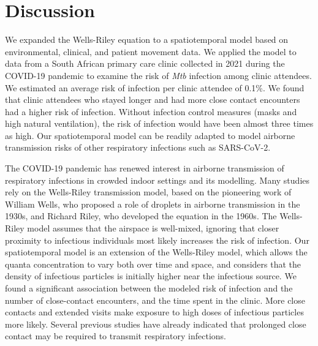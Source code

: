 \documentclass[fleqn,11pt]{wlscirep}
\begin{document}
\FloatBarrier

\newpage

\section*{Discussion}

We expanded the Wells-Riley equation to a spatiotemporal model based on environmental, clinical, and patient movement data. We applied the model to data from a South African primary care clinic collected in 2021 during the COVID-19 pandemic to examine the risk of \emph{Mtb} infection among clinic attendees. We estimated an average risk of infection per clinic attendee of 0.1\%. We found that clinic attendees who stayed longer and had more close contact encounters had a higher risk of infection. Without infection control measures (masks and high natural ventilation), the risk of infection would have been almost three times as high. Our spatiotemporal model can be readily adapted to model airborne transmission risks of other respiratory infections such as SARS-CoV-2.

The COVID-19 pandemic has renewed interest in airborne transmission of respiratory infections in crowded indoor settings\cite{Wang2021Science,Morawska2021,Greenhalgh2022BMJ} and its modelling\cite{Shen2021STBE,Buonanno2020EI,Edwards2024RiskAnalysis}. Many studies\cite{Andrews2014JID,Taylor2016IJTLD,Hella2017JInfect,Zemouri2020JDR} rely on the Wells-Riley transmission model\cite{Riley1961Book}, based on the pioneering work of William Wells, who proposed a role of droplets in airborne transmission in the 1930s\cite{Wells1934AJE}, and Richard Riley, who developed the equation in the 1960s\cite{Riley1961Book}.  The Wells-Riley model assumes that the airspace is well-mixed, ignoring that closer proximity to infectious individuals most likely increases the risk of infection. Our spatiotemporal model is an extension of the Wells-Riley model, which allows the quanta concentration to vary both over time and space, and considers that the density of infectious particles is initially higher near the infectious source\cite{Wang2021Science,Vuorinen2020SafSci,Chen2020BuildEnv}. We found a significant association between the modeled risk of infection and the number of close-contact encounters, and the time spent in the clinic. More close contacts and extended visits make exposure to high doses of infectious particles more likely. Several previous studies have already indicated that prolonged close contact may be required to transmit respiratory infections\cite{Leung2020NatMed,Brankston2007LancetID,Narasimhan2013PulmonaryMed}. 
\end{document}
